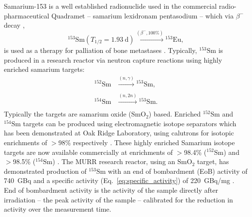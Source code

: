 \documentclass[../main.tex]{subfiles}
\begin{document}
Samarium-153 is a well established radionuclide used in the commercial radio-pharmaceutical Quadramet \cite{ema2015quadramet} -- samarium lexidronam pentasodium -- which via $\beta^{-}$ decay ,
\begin{equation}
^{153}\mathrm{Sm} \left(T_{1/2} = 1.93~\mathrm{\si{\day}}\right)\xrightarrow[]{\left(\beta^{-},\mathrm{100\%}\right)} {}^{153}\mathrm{Eu},
\label{eq:153Sm_beta_minus_decay}    
\end{equation}
is used as a therapy for palliation of bone metastases \cite{kapoor2021cancer,murray2021systemic}. Typically, $^{153}\mathrm{Sm}$ is produced in a research reactor via neutron capture reactions using highly enriched samarium targets: 
\begin{align}
^{152}\mathrm{Sm}&\xrightarrow[]{\left(n,\gamma\right)}{}^{153}\mathrm{Sm}, \\
^{154}\mathrm{Sm}&\xrightarrow[]{\left(n,2n\right)}{}^{153}\mathrm{Sm}.
\label{eq:153Sm_research_reactor_production}
\end{align}
Typically the targets are samarium oxide ($\mathrm{SmO}_{2}$) based. Enriched $^{152}\mathrm{Sm}$ and $^{154}\mathrm{Sm}$ targets can be produced using electromagnetic isotope separators which has been demonstrated at Oak Ridge Laboratory, using calutrons for isotopic enrichments of $>$98\% respectively \cite{bell1987stable}. These highly enriched Samarium isotope targets are now available commercially at enrichments of $>$98.4\% ($^{152}\mathrm{Sm}$) and $>$98.5\% ($^{154}\mathrm{Sm}$) \cite{isoflex2021sm}. The MURR research reactor, using an $\mathrm{SmO}_{2}$ target, has demonstrated production of $^{153}\mathrm{Sm}$ with an end of bombardment (EoB) activity of 740~\si{\giga\becquerel} and a specific activity (Eq.~\ref{eq:specific_activity}) of 220~\si{\giga\becquerel}/\si{\milli\gram} \cite{ma1996production}. End of bombardment activity is the activity of the sample directly after irradiation -- the peak activity of the sample -- calibrated for the reduction in activity over the measurement time. 
\end{document}
